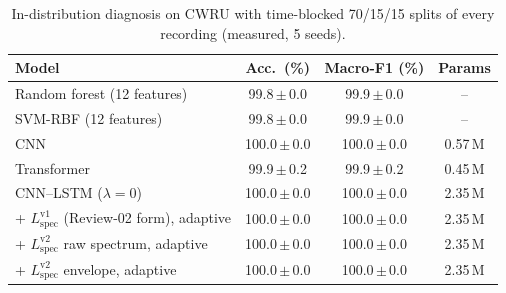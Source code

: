 \begin{table}[t]
\caption{In-distribution diagnosis on CWRU with time-blocked 70/15/15 splits of every recording (measured, 5 seeds).}
\label{tab:indist}
\centering
\footnotesize
\begin{tabular}{lccc}
\toprule
Model & Acc.\ (\%) & Macro-F1 (\%) & Params \\
\midrule
Random forest (12 features) & 99.8\,$\pm$\,0.0 & 99.9\,$\pm$\,0.0 & -- \\
SVM-RBF (12 features) & 99.8\,$\pm$\,0.0 & 99.9\,$\pm$\,0.0 & -- \\
CNN & 100.0\,$\pm$\,0.0 & 100.0\,$\pm$\,0.0 & 0.57\,M \\
Transformer & 99.9\,$\pm$\,0.2 & 99.9\,$\pm$\,0.2 & 0.45\,M \\
CNN--LSTM ($\lambda=0$) & 100.0\,$\pm$\,0.0 & 100.0\,$\pm$\,0.0 & 2.35\,M \\
\midrule
+ $L_{\mathrm{spec}}^{\mathrm{v1}}$ (Review-02 form), adaptive & 100.0\,$\pm$\,0.0 & 100.0\,$\pm$\,0.0 & 2.35\,M \\
+ $L_{\mathrm{spec}}^{\mathrm{v2}}$ raw spectrum, adaptive & 100.0\,$\pm$\,0.0 & 100.0\,$\pm$\,0.0 & 2.35\,M \\
+ $L_{\mathrm{spec}}^{\mathrm{v2}}$ envelope, adaptive & 100.0\,$\pm$\,0.0 & 100.0\,$\pm$\,0.0 & 2.35\,M \\
\bottomrule
\end{tabular}
\end{table}
